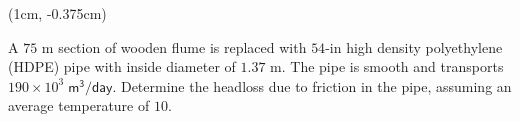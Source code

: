 \documentclass[9pt,xcolor={svgnames, x11names},professionalfonts, mathserif]{beamer}
\begin{document}
                       \begin{frame}

                        \begin{textblock*}{1\columnwidth}(1cm, -0.375cm)
                         \begin{cmini}[0.8]{
                           \begin{myexam}{}{}
														 \raggedright
                             A $75\text{ m}$ section of wooden flume is replaced with $54\text{-in}$ high density polyethylene (HDPE) pipe with inside diameter of
                             $1.37\text{ m}$.  The pipe is smooth and transports $190\times10^{3}\;\mathsf{ m^3/day}$. Determine the headloss due to friction in the
                             pipe, assuming an average temperature of $10$\textcelsius.\pars
                           \end{myexam}
                           }\end{cmini}
                          \end{textblock*}

                                  \end{frame}
\end{document}
